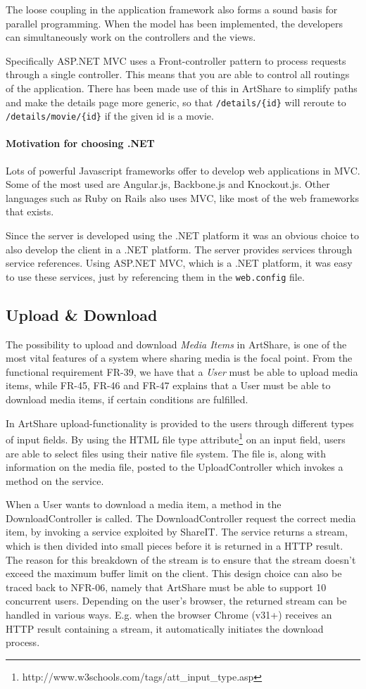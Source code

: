 \documentclass[../report.tex]{subfiles}
\begin{document}
The loose coupling in the application framework also forms a sound basis for parallel programming. When the model has been implemented, the developers can simultaneously work on the controllers and the views.

Specifically ASP.NET MVC uses a Front-controller pattern to process requests through a single controller. This means that you are able to control all routings of the application. There has been made use of this in ArtShare to simplify paths and make the details page more generic, so that \texttt{/details/\{id\}} will reroute to \texttt{/details/movie/\{id\}} if the given id is a movie.

\paragraph{Motivation for choosing .NET}
Lots of powerful Javascript frameworks offer to develop web applications in MVC. Some of the most used are Angular.js, Backbone.js and Knockout.js. Other languages such as Ruby on Rails also uses MVC, like most of the web frameworks that exists.

Since the server is developed using the .NET platform it was an obvious choice to also develop the client in a .NET platform. The server provides services through service references. Using ASP.NET MVC, which is a .NET platform, it was easy to use these services, just by referencing them in the \texttt{web.config} file. 

\subsection{Upload \& Download}

The possibility to upload and download \textit{Media Items} in ArtShare, is one of the most vital features of a system where sharing media is the focal point. From the functional requirement FR-39, we have that a \textit{User} must be able to upload media items, while FR-45, FR-46 and FR-47 explains that a User must be able to download media items, if certain conditions are fulfilled.

In ArtShare upload-functionality is provided to the users through different types of input fields. By using the HTML file type attribute\footnote{http://www.w3schools.com/tags/att\_input\_type.asp} on an input field, users are able to select files using their native file system. The file is, along with information on the media file, posted to the UploadController which invokes a method on the service.

When a User wants to download a media item, a method in the DownloadController is called. The DownloadController request the correct media item, by invoking a service exploited by ShareIT. The service returns a stream, which is then divided into small pieces before it is returned in a HTTP result. The reason for this breakdown of the stream is to ensure that the stream doesn't exceed the maximum buffer limit on the client. This design choice can also be traced back to NFR-06, namely that ArtShare must be able to support 10 concurrent users. Depending on the user's browser, the returned stream can be handled in various ways. E.g. when the browser Chrome (v31+) receives an HTTP result containing a stream, it automatically initiates the download process.
\end{document}

